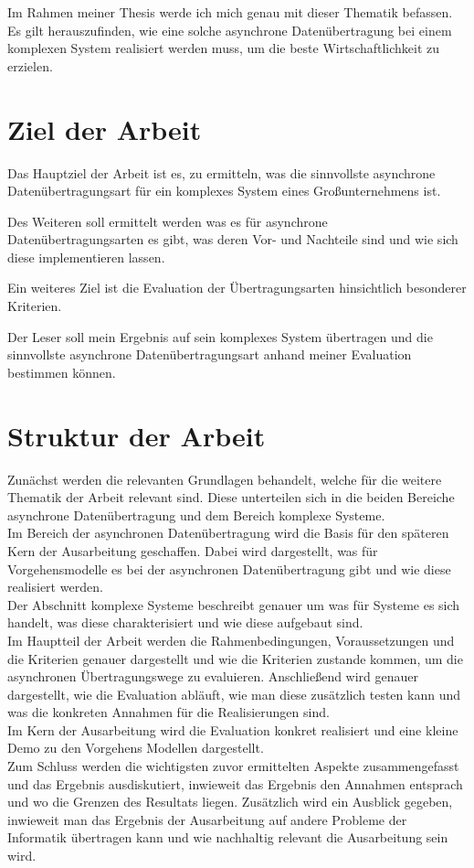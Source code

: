 Im Rahmen meiner Thesis werde ich mich genau mit dieser Thematik befassen. Es gilt herauszufinden, wie eine solche asynchrone Datenübertragung bei einem komplexen System realisiert werden muss, um die beste Wirtschaftlichkeit zu erzielen.


%
%
\section{Ziel der Arbeit}
\label{sec:intro:goal}
Das Hauptziel der Arbeit ist es, zu ermitteln, was die sinnvollste asynchrone Datenübertragungsart für ein komplexes System eines Großunternehmens ist. 

Des Weiteren soll ermittelt werden was es für asynchrone Datenübertragungsarten es gibt, was deren Vor- und Nachteile sind und wie sich diese implementieren lassen. 

Ein weiteres Ziel ist die Evaluation der Übertragungsarten hinsichtlich besonderer Kriterien. 

Der Leser soll mein Ergebnis auf sein komplexes System übertragen und die sinnvollste asynchrone Datenübertragungsart anhand meiner Evaluation bestimmen können. 


%
%
\section{Struktur der Arbeit}
\label{sec:intro:structure}
Zunächst werden die relevanten Grundlagen behandelt, welche für die weitere Thematik der Arbeit relevant sind. 
Diese unterteilen sich in die beiden Bereiche asynchrone Datenübertragung und dem Bereich komplexe Systeme. \\

Im Bereich der asynchronen Datenübertragung wird die Basis für den späteren Kern der Ausarbeitung geschaffen. 
Dabei wird dargestellt, was für Vorgehensmodelle es bei der asynchronen Datenübertragung gibt und wie diese realisiert werden.\\

Der Abschnitt komplexe Systeme beschreibt genauer um was für Systeme es sich handelt, was diese charakterisiert und wie diese aufgebaut sind.\\

Im Hauptteil der Arbeit werden die Rahmenbedingungen, Voraussetzungen und die Kriterien genauer dargestellt und wie die Kriterien zustande kommen, um die asynchronen Übertragungswege zu evaluieren. 
Anschließend wird genauer dargestellt, wie die Evaluation abläuft, wie man diese zusätzlich testen kann und was die konkreten Annahmen für die Realisierungen sind. \\

Im Kern der Ausarbeitung wird die Evaluation konkret realisiert und eine kleine Demo zu den Vorgehens Modellen dargestellt. \\

Zum Schluss werden die wichtigsten zuvor ermittelten Aspekte zusammengefasst und das Ergebnis ausdiskutiert, inwieweit das Ergebnis den Annahmen entsprach und wo die Grenzen des Resultats liegen. 
Zusätzlich wird ein Ausblick gegeben, inwieweit man das Ergebnis der Ausarbeitung auf andere Probleme der Informatik übertragen kann und wie nachhaltig relevant die Ausarbeitung sein wird.